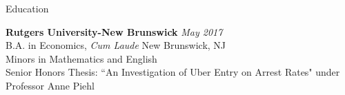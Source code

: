 \documentclass{resume} %
\begin{document}

\begin{rSection}{Education}

{\bf Rutgers University-New Brunswick} \hfill {\em May 2017} \\ 
B.A. in Economics, \emph{Cum Laude} \hfill {New Brunswick, NJ} \\
Minors in Mathematics and English  \\
Senior Honors Thesis: ``An Investigation of Uber Entry on Arrest Rates" under Professor Anne Piehl
\end{rSection}
\end{document}
